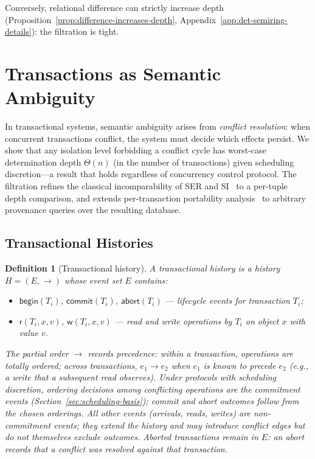 \documentclass[acmsmall,review,anonymous]{acmart}
\newtheorem{definition}{Definition}
\theoremstyle{remark}
\numberwithin{definition}{section}
\numberwithin{theorem}{section}
\numberwithin{lemma}{section}
\numberwithin{corollary}{section}
\numberwithin{remark}{section}
\numberwithin{example}{section}
\numberwithin{observation}{section}
\numberwithin{assumption}{section}
\begin{document}
\noindent
Conversely, relational difference can strictly increase depth
(Proposition~\ref{prop:difference-increases-depth},
Appendix~\ref{app:det-semiring-details}): the filtration is tight.


\section{Transactions as Semantic Ambiguity}
\label{sec:transactions}

In transactional systems, semantic ambiguity arises from
\emph{conflict resolution}: when concurrent transactions conflict,
the system must decide which effects persist.
We show that any isolation level forbidding a conflict cycle has
worst-case determination depth $\Theta(n)$ (in the number of
transactions) given scheduling
discretion---a result that holds regardless of concurrency control
protocol.
The filtration refines the classical incomparability of SER and
SI~\cite{adya1999weak} to a per-tuple depth comparison, and extends
per-transaction portability analysis~\cite{vandevoort2025mixed} to
arbitrary provenance queries over the resulting database.

\subsection{Transactional Histories}

\begin{definition}[Transactional history]
  \label{def:txn-history}
  A \emph{transactional history} is a history $H = (E, \rightarrow)$ whose
  event set $E$ contains:
  \begin{itemize}[nosep]
    \item $\mathsf{begin}(T_i)$, $\mathsf{commit}(T_i)$, $\mathsf{abort}(T_i)$
          --- lifecycle events for transaction $T_i$;
    \item $\mathsf{r}(T_i, x, v)$, $\mathsf{w}(T_i, x, v)$ --- read and write
          operations by $T_i$ on object $x$ with value $v$.
  \end{itemize}
  The partial order $\rightarrow$ records precedence: within a
  transaction, operations are totally ordered; across transactions,
  $e_1 \rightarrow e_2$ when $e_1$ is known to precede $e_2$ (e.g., a
  write that a subsequent read observes).
  Under protocols with scheduling discretion, ordering decisions among
  conflicting operations are the commitment events
  (Section~\ref{sec:scheduling-basis}); commit and abort outcomes
  follow from the chosen orderings.
  All other events (arrivals, reads, writes) are non-commitment events;
  they extend the history and may introduce conflict edges but do not
  themselves exclude outcomes.
  Aborted transactions remain in $E$: an abort records that a conflict
  was resolved against that transaction.
\end{definition}
\end{document}
